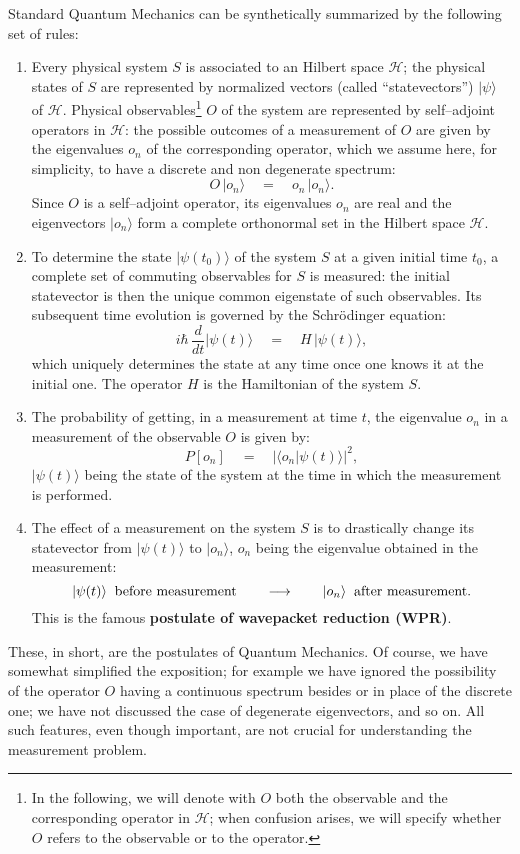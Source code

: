\documentclass[12pt]{article}
\begin{document}
Standard Quantum Mechanics can be synthetically summarized by the
following set of rules:
\begin{enumerate}
\item Every physical system $S$ is associated to an Hilbert space
${\mathcal H}$; the physical states of $S$ are represented by
normalized vectors (called ``statevectors'') $|\psi\rangle$ of
${\mathcal H}$. Physical observables\footnote{In the following, we
will denote with $O$ both the observable and the corresponding
operator in ${\mathcal H}$; when confusion arises, we will specify
whether $O$ refers to the observable or to the operator.} $O$ of
the system are represented by self--adjoint operators in
${\mathcal H}$: the possible outcomes of a measurement of $O$ are
given by the eigenvalues $o_{n}$ of the corresponding operator,
which we assume here, for simplicity, to have a discrete and non
degenerate spectrum:
\begin{equation}
O\,|o_{n}\rangle\quad =\quad o_{n}\,|o_{n}\rangle.
\end{equation}
Since $O$ is a self--adjoint operator, its eigenvalues $o_{n}$ are
real and the eigenvectors $|o_{n}\rangle$ form a complete
orthonormal set in the Hilbert space ${\mathcal H}$.
\item To determine the state $|\psi(t_{0})\rangle$ of
the system $S$ at a given initial time $t_{0}$, a complete set of
commuting observables for $S$ is measured: the initial statevector
is then the unique common eigenstate of such observables. Its
subsequent time evolution is governed by the Schr\"odinger
equation:
\begin{equation} \label{sce}
i\hbar\,\frac{d}{dt}|\psi(t)\rangle \quad = \quad H\,
|\psi(t)\rangle,
\end{equation}
which uniquely determines the state at any time once one knows it
at the initial one. The operator $H$ is the Hamiltonian of the
system $S$.
\item The probability of getting, in a measurement at time $t$,
the eigenvalue $o_{n}$ in a measurement of the observable $O$ is
given by:
\begin{equation}
P[o_{n}] \quad = \quad |\langle o_{n} |\psi(t)\rangle |^{2},
\end{equation}
$|\psi(t)\rangle$ being the state of the system at the time in
which the measurement is performed.
\item The effect of a measurement on the system $S$ is to
drastically change its statevector from $|\psi(t)\rangle$ to
$|o_{n}\rangle$, $o_{n}$ being the eigenvalue obtained in the
measurement:
\[
|\psi(t)\rangle \;\;\makebox{before measurement} \qquad
\longrightarrow \qquad |o_{n}\rangle \;\;\makebox{after
measurement}.
\]
This is the famous {\bf postulate of wavepacket reduction (WPR)}.
\end{enumerate}
These, in short, are the postulates of Quantum Mechanics. Of
course, we have somewhat simplified the exposition; for example we
have ignored the possibility of the operator $O$ having a
continuous spectrum besides or in place of the discrete one; we
have not discussed the case of degenerate eigenvectors, and so on.
All such features, even though important, are not crucial for
understanding the measurement problem.
\end{document}
